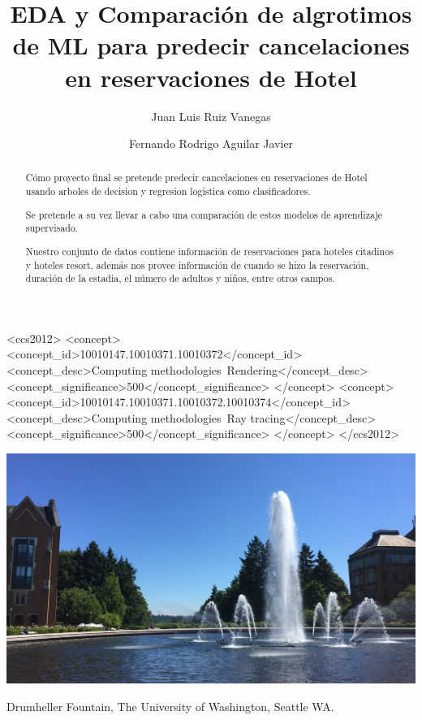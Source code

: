 \documentclass[sigconf]{acmart}
\begin{document}
\title{EDA y Comparación de algrotimos de ML para predecir cancelaciones en reservaciones de Hotel }

\author{Juan Luis Ruiz Vanegas}

\author{Fernando Rodrigo Aguilar Javier}

\renewcommand{\shortauthors}{Luis Ruiz, Faguilar}

\begin{abstract}
Cómo proyecto final se pretende predecir cancelaciones en reservaciones de Hotel usando arboles de decision y regresion logistica como clasificadores.

Se pretende a su vez llevar a cabo una comparación de estos modelos de aprendizaje supervisado.

Nuestro conjunto de datos contiene información de reservaciones para hoteles citadinos y hoteles resort, además nos provee información de cuando se hizo la reservación, duración de la estadia, el número de adultos y niños, entre otros campos.

\end{abstract}

\begin{CCSXML}
<ccs2012>
<concept>
<concept_id>10010147.10010371.10010372</concept_id>
<concept_desc>Computing methodologies~Rendering</concept_desc>
<concept_significance>500</concept_significance>
</concept>
<concept>
<concept_id>10010147.10010371.10010372.10010374</concept_id>
<concept_desc>Computing methodologies~Ray tracing</concept_desc>
<concept_significance>500</concept_significance>
</concept>
</ccs2012>
\end{CCSXML}



\begin{teaserfigure}
  \centering
  \includegraphics[width=6.0in]{aaafiles/fountain}
  \caption{Drumheller Fountain, The University of Washington, Seattle WA.}
\end{teaserfigure}

\maketitle
\end{document}
